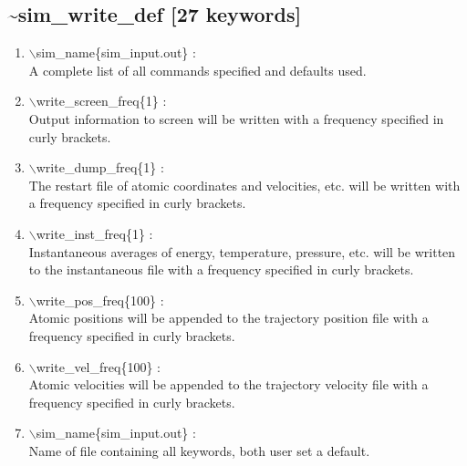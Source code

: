 \documentclass[12pt]{article}
\begin{document}
\subsection*{\bf \~{}sim\_write\_def [27 keywords]}
\begin{enumerate}

 \vspace{0.15in} 
 \item   $\backslash$sim\_name\{sim\_input.out\} : \\
    A complete list of all commands specified and defaults used.

 \vspace{0.15in} 
 \item   $\backslash$write\_screen\_freq\{1\} : \\
   Output information to screen will be written with a frequency specified
   in curly brackets.

 \vspace{0.15in} 
 \item   $\backslash$write\_dump\_freq\{1\} : \\
     The restart file of atomic coordinates and velocities, etc. will be
     written with a frequency specified in curly brackets.

 \vspace{0.15in}
 \item   $\backslash$write\_inst\_freq\{1\} : \\
     Instantaneous averages of energy, temperature, pressure, etc. will be 
     written to the instantaneous file with a frequency specified in curly 
     brackets.

 \vspace{0.15in} 
 \item   $\backslash$write\_pos\_freq\{100\} : \\
    Atomic positions will be appended to the trajectory position file with
    a frequency specified in curly brackets.

 \vspace{0.15in} 
 \item   $\backslash$write\_vel\_freq\{100\} : \\
    Atomic velocities will be appended to the trajectory velocity file with
    a frequency specified in curly brackets.

 \vspace{0.15in} 
 \item   $\backslash$sim\_name\{sim\_input.out\} : \\
     Name of file containing all keywords, both user set a default.


\end{enumerate}
\end{document}
